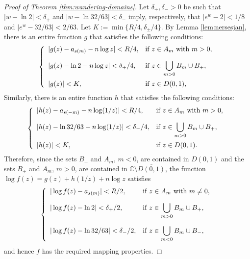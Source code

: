 \documentclass[a4paper, 12pt, reqno]{amsart}
\newcommand{\margin}[1]{\marginnote{\red{#1}}}
\numberwithin{equation}{section}
\newcommand{\red}[1]{{\color{red} #1}}
\newcommand{\ds}{\displaystyle}
\theoremstyle{plain}
\theoremstyle{definition}
\theoremstyle{remark}
\newcommand{\C}{{\mathbb{C}}}
\begin{document}
\begin{proof}[Proof of Theorem \ref{thm:wandering-domains}]
Let $\delta_+,\delta_->0$ be such that $|w-\ln 2|\! <\! \delta_+$ and \mbox{$|w-\ln 32/63|\! <\! \delta_-$} imply, respectively, that $|e^w-2|<1/8$ and $|e^w-32/63|<2/63$. Let $K:=\min\{R/4, \delta_\pm/4\}$. By Lemma \ref{lem:nersesjan}, there is an entire function $g$ that satisfies the following conditions:
$$
\left\{
\begin{array}{ll}
|g(z)-a_{s(m)}-n\log z|<R/4, & \mbox{if } z\in A_m \mbox{ with } m>0,\vspace{10pt}\\
|g(z)-\ln 2-n\log z|<\delta_+/4, & \ds\mbox{if } z\in \bigcup_{m>0} B_m\cup B_+,\vspace{5pt}\\
|g(z)|<K, & \mbox{if } z\in D(0,1),
\end{array}
\right.\vspace{5pt}
$$
Similarly, there is an entire function $h$ that satisfies the following conditions:
 $$ \left\{
\begin{array}{ll}
|h(z)-a_{s(-m)}-n\log (1/z)|<R/4, & \mbox{if } z\in A_m \mbox{ with } m>0,\vspace{10pt}\\
|h(z)-\ln 32/63-n\log (1/z)|<\delta_-/4, & \ds\mbox{if } z\in \bigcup_{m>0} B_m\cup B_+,\vspace{5pt}\\
|h(z)|<K, & \mbox{if } z\in D(0,1).
\end{array}
\right.\vspace{5pt}
$$
Therefore, since the sets $B_-$ and $A_m$, $m<0$, are contained in $D(0,1)$ and the sets $B_+$ and $A_m$, $m>0$, are contained in $\C\setminus \overline{D(0,1)}$, the function $\log f(z)=g(z)+h(1/z)+n\log z$ satisfies
$$
\left\{
\begin{array}{ll}
|\log f(z)-a_{s(m)}|<R/2, & \mbox{if } z\in A_m \mbox{ with } m\neq 0,\vspace{10pt}\\
|\log f(z)-\ln 2|<\delta_+/2, & \ds\mbox{if } z\in  \bigcup_{m>0} B_m\cup B_+,\vspace{10pt}\\
|\log f(z)-\ln 32/63|<\delta_-/2, & \ds\mbox{if } z\in  \bigcup_{m<0} B_m\cup B_-,\\
\end{array}
\right.
$$
and hence $f$ has the required mapping properties.



\end{proof}
\end{document}
